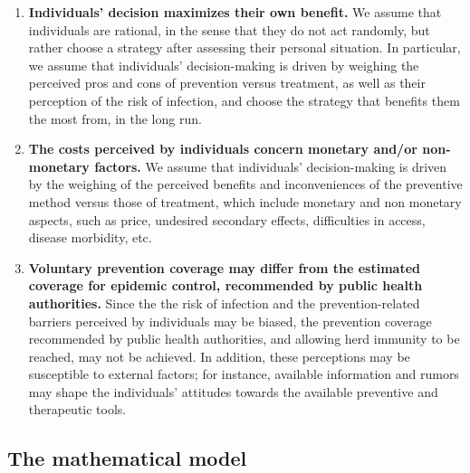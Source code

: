 \begin{enumerate}[label= \bf \roman*)]
\item \textbf{Individuals' decision maximizes their own benefit.} 
We assume that individuals are rational, in the sense that they do not act randomly, but rather  choose a strategy  after assessing their personal situation. In particular, we assume that individuals' decision-making is driven by weighing the perceived pros and cons of prevention versus treatment, as well as their perception of the risk of infection, and choose the strategy that benefits them the most from, in the long run.
\item \textbf{The costs perceived by individuals concern monetary and/or non-monetary factors.} 
We assume that individuals' decision-making is driven by the weighing of the perceived benefits and inconveniences of the preventive method versus those of treatment, which include monetary and non monetary aspects, such as price, undesired secondary effects, difficulties in access, disease morbidity, etc.


\item \textbf{Voluntary prevention coverage may differ from the estimated coverage for epidemic control, recommended by public health authorities.} 
Since the the risk of infection and the prevention-related barriers perceived by individuals may be biased, the prevention coverage recommended by public health authorities, and allowing herd immunity to be reached, may not be achieved. In addition, these perceptions may be susceptible to external factors; for instance, available information and rumors may shape the individuals' attitudes towards the available preventive and therapeutic tools.
\end{enumerate}


\subsection{The mathematical model}
\label{Intro:Model} 


